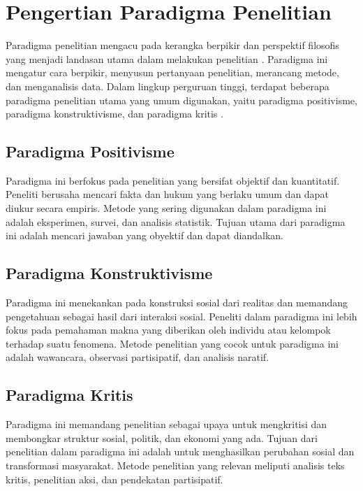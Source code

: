 \section{Pengertian Paradigma Penelitian}
Paradigma penelitian mengacu pada kerangka berpikir dan perspektif filosofis yang menjadi landasan utama dalam melakukan penelitian \citep{denzin2011sage}. Paradigma ini mengatur cara berpikir, menyusun pertanyaan penelitian, merancang metode, dan menganalisis data. Dalam lingkup perguruan tinggi, terdapat beberapa paradigma penelitian utama yang umum digunakan, yaitu paradigma positivisme, paradigma konstruktivisme, dan paradigma kritis \citep{butsi2019memahami}.

\subsection{Paradigma Positivisme}
Paradigma ini berfokus pada penelitian yang bersifat objektif dan kuantitatif. Peneliti berusaha mencari fakta dan hukum yang berlaku umum dan dapat diukur secara empiris. Metode yang sering digunakan dalam paradigma ini adalah eksperimen, survei, dan analisis statistik. Tujuan utama dari paradigma ini adalah mencari jawaban yang obyektif dan dapat diandalkan.

\subsection{Paradigma Konstruktivisme}
Paradigma ini menekankan pada konstruksi sosial dari realitas dan memandang pengetahuan sebagai hasil dari interaksi sosial. Peneliti dalam paradigma ini lebih fokus pada pemahaman makna yang diberikan oleh individu atau kelompok terhadap suatu fenomena. Metode penelitian yang cocok untuk paradigma ini adalah wawancara, observasi partisipatif, dan analisis naratif.

\subsection{Paradigma Kritis}
Paradigma ini memandang penelitian sebagai upaya untuk mengkritisi dan membongkar struktur sosial, politik, dan ekonomi yang ada. Tujuan dari penelitian dalam paradigma ini adalah untuk menghasilkan perubahan sosial dan transformasi masyarakat. Metode penelitian yang relevan meliputi analisis teks kritis, penelitian aksi, dan pendekatan partisipatif.